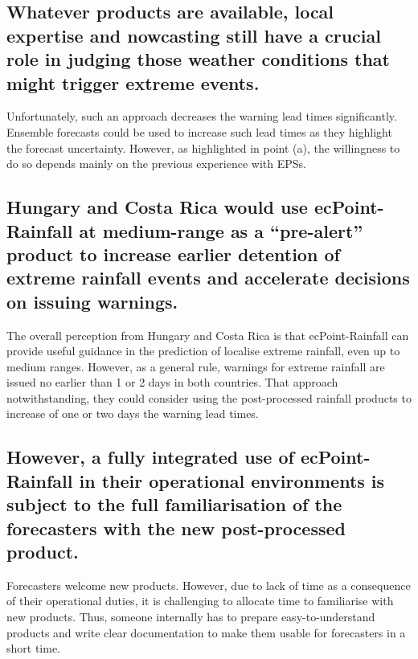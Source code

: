 \documentclass[twocol]{ametsocV5} %
\begin{document}
\subsection{Whatever products are available, local expertise and nowcasting still have a crucial role in judging those weather conditions that might trigger extreme events.}
    Unfortunately, such an approach decreases the warning lead times significantly. Ensemble forecasts could be used to increase such lead times as they highlight the forecast uncertainty. However, as highlighted in point (a), the willingness to do so depends mainly on the previous experience with EPSs.  

\subsection{Hungary and Costa Rica would use ecPoint-Rainfall at medium-range as a “pre-alert” product to increase earlier detention of extreme rainfall events and accelerate decisions on issuing warnings.}
    The overall perception from Hungary and Costa Rica is that ecPoint-Rainfall can provide useful guidance in the prediction of localise extreme rainfall, even up to medium ranges. However, as a general rule, warnings for extreme rainfall are issued no earlier than 1 or 2 days in both countries. That approach notwithstanding, they could consider using the post-processed rainfall products to increase of one or two days the warning lead times.  

\subsection{However, a fully integrated use of ecPoint-Rainfall in their operational environments is subject to the full familiarisation of the forecasters with the new post-processed product.}
    Forecasters welcome new products. However, due to lack of time as a consequence of their operational duties, it is challenging to allocate time to familiarise with new products. Thus, someone internally has to prepare easy-to-understand products and write clear documentation to make them usable for forecasters in a short time.  
\end{document}
